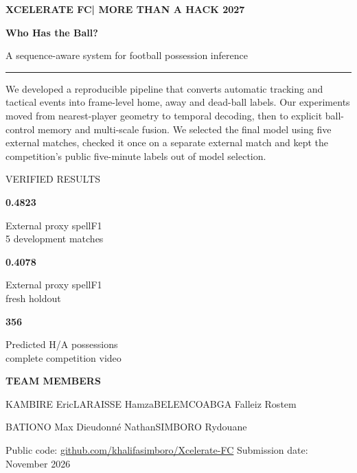 \documentclass[11pt,a4paper]{article}
\newcommand{\micro}[1]{{\sffamily\fontsize{7.5}{10}\selectfont\color{muted}#1}}
\newcommand{\metric}[2]{\begin{minipage}[t]{.29\linewidth}\sffamily\fontsize{20}{23}\selectfont\bfseries\color{cardinal} #1\par\vspace{3pt}\fontsize{8}{10}\selectfont\color{muted} #2\end{minipage}}
\begin{document}
\thispagestyle{empty}
\vspace*{18mm}
{\sffamily\fontsize{10}{12}\selectfont\bfseries\color{cardinal} XCELERATE FC\hspace{5mm}|\hspace{5mm} MORE THAN A HACK 2027}\par
\vspace{28mm}
{\sffamily\fontsize{33}{36}\selectfont\bfseries\color{charcoal} Who Has the Ball?}\par
\vspace{5mm}
{\sffamily\fontsize{20}{25}\selectfont\color{charcoal} A sequence-aware system for football possession inference}\par
\vspace{9mm}
{\color{cardinal}\rule{38mm}{1.7pt}}\par
\vspace{15mm}
\begin{minipage}{.88\linewidth}
\fontsize{12}{16}\selectfont
We developed a reproducible pipeline that converts automatic tracking and tactical events into frame-level home, away and dead-ball labels. Our experiments moved from nearest-player geometry to temporal decoding, then to explicit ball-control memory and multi-scale fusion. We selected the final model using five external matches, checked it once on a separate external match and kept the competition's public five-minute labels out of model selection.
\end{minipage}
\vspace{20mm}
{\sffamily\fontsize{9}{11}\selectfont\color{muted} VERIFIED RESULTS}\par\vspace{5mm}
\metric{0.4823}{External proxy spellF1\\5 development matches}\hfill
\metric{0.4078}{External proxy spellF1\\fresh holdout}\hfill
\metric{356}{Predicted H/A possessions\\complete competition video}\par
\vfill
{\sffamily\fontsize{9}{11}\selectfont\bfseries TEAM MEMBERS}\par\vspace{3mm}
{\fontsize{11}{15}\selectfont
KAMBIRE Eric\quad LARAISSE Hamza\quad BELEMCOABGA Falleiz Rostem\par
BATIONO Max Dieudonn\'e Nathan\quad SIMBORO Rydouane\par}
\vspace{10mm}
\micro{Public code: \href{https://github.com/khalifasimboro/Xcelerate-FC}{github.com/khalifasimboro/Xcelerate-FC} \hfill Submission date: November 2026}\par
\end{document}
